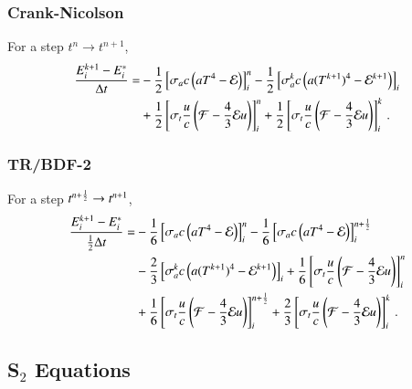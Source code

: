 \subsubsection{Crank-Nicolson}
For a step $t^n\rightarrow t^{n+1}$,
\begin{equation}\begin{split}
  \frac{E_i^{k+1}-E_i^*}{\dt} = &
  -\half\left[\sigma_{a} c\left(aT^4 - \E\right)\right]_i^n
  -\half\left[\sigma_{a}^k c\left(a(T^{k+1})^4 - \E^{k+1}\right)\right]_i\\
  &+\half\left[\sigma_{t}\frac{u}{c}\left(\F-\frac{4}{3}\E u\right)\right]_i^n
   +\half\left[\sigma_{t}\frac{u}{c}\left(\F-\frac{4}{3}\E u\right)\right]_i^k
  \pep
\lequ{hydroECNfull}
\end{split}\end{equation}

\subsubsection{TR/BDF-2}
For a step $t^{n+\frac{1}{2}}\rightarrow t^{n+1}$,
\begin{equation}\begin{split}
  \frac{E_i^{k+1}-E_i^*}{\half\dt} = &
  -\sixth\left[\sigma_a c\left(aT^4 - \E\right)\right]_i^n
  -\sixth\left[\sigma_a c\left(aT^4 - \E\right)\right]_i^{n+\half}\\
  &-\frac{2}{3}\left[\sigma_a^k c\left(a(T^{k+1})^4 - \E^{k+1}\right)\right]_i
   +\sixth\left[\sigma_t\frac{u}{c}\left(\F-\frac{4}{3}\E u\right)\right]_i^n\\
  &+\sixth\left[\sigma_t\frac{u}{c}\left(\F-\frac{4}{3}\E u\right)\right]_i^{n+\half}
   +\frac{2}{3}\left[\sigma_t\frac{u}{c}\left(\F-\frac{4}{3}\E u\right)\right]_i^k
  \pep
\lequ{hydroEBDF2full}
\end{split}\end{equation}

\subsection{\texorpdfstring{S$_2$}{S-2} Equations}
